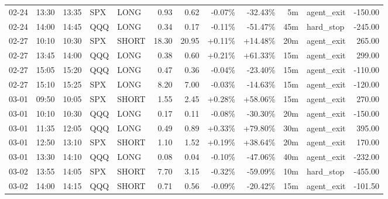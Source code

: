 \documentclass[11pt,a4paper]{article}
\begin{document}
\begin{center}
\begin{longtable}{>{\color{txtmain}}l l l l l r r r r r >{\color{txtmain}}l r}
02-24 & 13:30 & 13:35 & SPX & LONG & 0.93 & 0.62 & \textcolor{lossred}{-0.07\%} & \textcolor{lossred}{-32.43\%} & 5m & agent\_exit & \textcolor{lossred}{-150.00} \\
02-24 & 14:00 & 14:45 & QQQ & LONG & 0.34 & 0.17 & \textcolor{lossred}{-0.11\%} & \textcolor{lossred}{-51.47\%} & 45m & hard\_stop & \textcolor{lossred}{-245.00} \\
02-27 & 10:10 & 10:30 & SPX & SHORT & 18.30 & 20.95 & \textcolor{wingreen}{+0.11\%} & \textcolor{wingreen}{+14.48\%} & 20m & agent\_exit & \textcolor{wingreen}{265.00} \\
02-27 & 13:45 & 14:00 & QQQ & LONG & 0.38 & 0.60 & \textcolor{wingreen}{+0.21\%} & \textcolor{wingreen}{+61.33\%} & 15m & agent\_exit & \textcolor{wingreen}{299.00} \\
02-27 & 15:05 & 15:20 & QQQ & LONG & 0.47 & 0.36 & \textcolor{lossred}{-0.04\%} & \textcolor{lossred}{-23.40\%} & 15m & agent\_exit & \textcolor{lossred}{-110.00} \\
02-27 & 15:10 & 15:25 & SPX & LONG & 8.20 & 7.00 & \textcolor{lossred}{-0.03\%} & \textcolor{lossred}{-14.63\%} & 15m & agent\_exit & \textcolor{lossred}{-120.00} \\
03-01 & 09:50 & 10:05 & SPX & SHORT & 1.55 & 2.45 & \textcolor{wingreen}{+0.28\%} & \textcolor{wingreen}{+58.06\%} & 15m & agent\_exit & \textcolor{wingreen}{270.00} \\
03-01 & 10:10 & 10:30 & QQQ & LONG & 0.17 & 0.11 & \textcolor{lossred}{-0.08\%} & \textcolor{lossred}{-30.30\%} & 20m & agent\_exit & \textcolor{lossred}{-150.00} \\
03-01 & 11:35 & 12:05 & QQQ & LONG & 0.49 & 0.89 & \textcolor{wingreen}{+0.33\%} & \textcolor{wingreen}{+79.80\%} & 30m & agent\_exit & \textcolor{wingreen}{395.00} \\
03-01 & 12:50 & 13:10 & SPX & SHORT & 1.10 & 1.52 & \textcolor{wingreen}{+0.19\%} & \textcolor{wingreen}{+38.64\%} & 20m & agent\_exit & \textcolor{wingreen}{170.00} \\
03-01 & 13:30 & 14:10 & QQQ & LONG & 0.08 & 0.04 & \textcolor{lossred}{-0.10\%} & \textcolor{lossred}{-47.06\%} & 40m & agent\_exit & \textcolor{lossred}{-232.00} \\
03-02 & 13:55 & 14:05 & SPX & SHORT & 7.70 & 3.15 & \textcolor{lossred}{-0.32\%} & \textcolor{lossred}{-59.09\%} & 10m & hard\_stop & \textcolor{lossred}{-455.00} \\
03-02 & 14:00 & 14:15 & QQQ & SHORT & 0.71 & 0.56 & \textcolor{lossred}{-0.09\%} & \textcolor{lossred}{-20.42\%} & 15m & agent\_exit & \textcolor{lossred}{-101.50} \\

\end{longtable}
\end{center}
\end{document}
